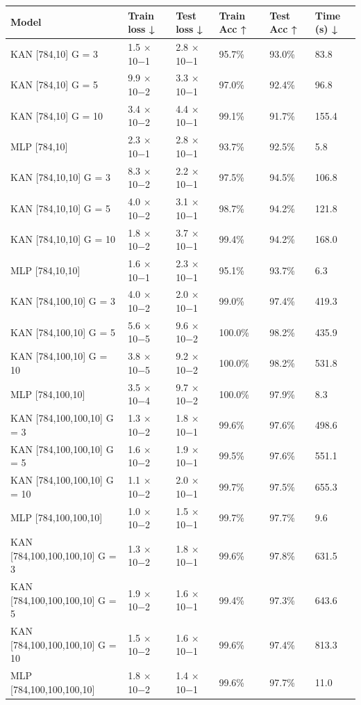 \begin{tabular}{llllll}
\toprule
Model & Train loss ↓ & Test loss ↓ & Train Acc ↑ & Test Acc ↑ & Time (s) ↓ \\
\midrule
KAN [784,10] G = 3 & 1.5 × 10−1 & 2.8 × 10−1 & 95.7\% & 93.0\% & 83.8 \\
KAN [784,10] G = 5 & 9.9 × 10−2 & 3.3 × 10−1 & 97.0\% & 92.4\% & 96.8 \\
KAN [784,10] G = 10 & 3.4 × 10−2 & 4.4 × 10−1 & 99.1\% & 91.7\% & 155.4 \\
MLP [784,10] & 2.3 × 10−1 & 2.8 × 10−1 & 93.7\% & 92.5\% & 5.8 \\
KAN [784,10,10] G = 3 & 8.3 × 10−2 & 2.2 × 10−1 & 97.5\% & 94.5\% & 106.8 \\
KAN [784,10,10] G = 5 & 4.0 × 10−2 & 3.1 × 10−1 & 98.7\% & 94.2\% & 121.8 \\
KAN [784,10,10] G = 10 & 1.8 × 10−2 & 3.7 × 10−1 & 99.4\% & 94.2\% & 168.0 \\
MLP [784,10,10] & 1.6 × 10−1 & 2.3 × 10−1 & 95.1\% & 93.7\% & 6.3 \\
KAN [784,100,10] G = 3 & 4.0 × 10−2 & 2.0 × 10−1 & 99.0\% & 97.4\% & 419.3 \\
KAN [784,100,10] G = 5 & 5.6 × 10−5 & 9.6 × 10−2 & 100.0\% & 98.2\% & 435.9 \\
KAN [784,100,10] G = 10 & 3.8 × 10−5 & 9.2 × 10−2 & 100.0\% & 98.2\% & 531.8 \\
MLP [784,100,10] & 3.5 × 10−4 & 9.7 × 10−2 & 100.0\% & 97.9\% & 8.3 \\
KAN [784,100,100,10] G = 3 & 1.3 × 10−2 & 1.8 × 10−1 & 99.6\% & 97.6\% & 498.6 \\
KAN [784,100,100,10] G = 5 & 1.6 × 10−2 & 1.9 × 10−1 & 99.5\% & 97.6\% & 551.1 \\
KAN [784,100,100,10] G = 10 & 1.1 × 10−2 & 2.0 × 10−1 & 99.7\% & 97.5\% & 655.3 \\
MLP [784,100,100,10] & 1.0 × 10−2 & 1.5 × 10−1 & 99.7\% & 97.7\% & 9.6 \\
KAN [784,100,100,100,10] G = 3 & 1.3 × 10−2 & 1.8 × 10−1 & 99.6\% & 97.8\% & 631.5 \\
KAN [784,100,100,100,10] G = 5 & 1.9 × 10−2 & 1.6 × 10−1 & 99.4\% & 97.3\% & 643.6 \\
KAN [784,100,100,100,10] G = 10 & 1.5 × 10−2 & 1.6 × 10−1 & 99.6\% & 97.4\% & 813.3 \\
MLP [784,100,100,100,10] & 1.8 × 10−2 & 1.4 × 10−1 & 99.6\% & 97.7\% & 11.0 \\
\bottomrule
\end{tabular}
